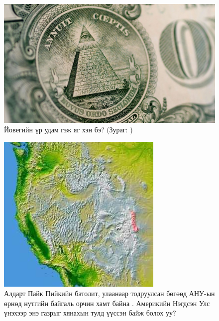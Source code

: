 \documentclass[10pt,twocolumn,letterpaper]{article}
\begin{document}
{\begin{figure}[t]
\begin{center}
   \includegraphics[width=1\linewidth]{illuminati.jpg}
\end{center}
   \caption{Йовегийн үр удам гэж яг хэн бэ? (Зураг: \cite{35})}
\label{fig:10}
\label{fig:onecol}
\end{figure}

\begin{figure}[t]
\begin{center}
   \includegraphics[width=1\linewidth]{pike.jpg}
\end{center}
   \caption{Алдарт Пайк Пийкийн батолит, улаанаар тодруулсан бөгөөд АНУ-ын өрнөд нутгийн байгаль орчин хамт байна \cite{36}. Америкийн Нэгдсэн Улс үнэхээр энэ газрыг хянахын тулд үүссэн байж болох уу?}
\label{fig:11}
\label{fig:onecol}
\end{figure}

}
\end{document}
